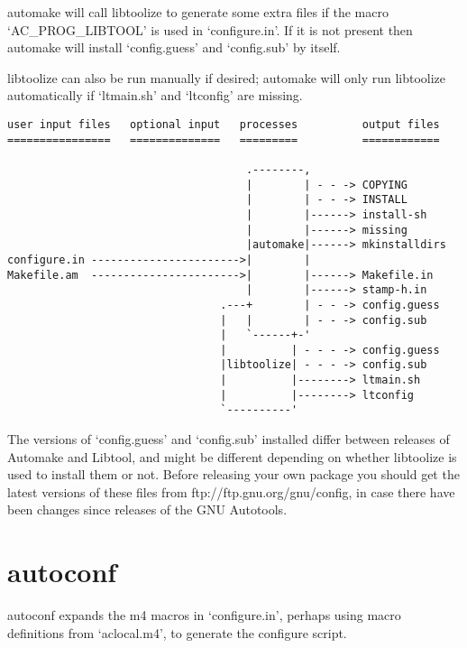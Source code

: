 automake will call libtoolize to generate some extra files if the 
macro `AC\_{}PROG\_{}LIBTOOL' is used in `configure.in'. If it is not 
present then automake will install `config.guess' and `config.sub' by itself.

libtoolize can also be run manually if desired; automake will only run libtoolize automatically if `ltmain.sh' and `ltconfig' are missing. 

\begin{verbatim}
user input files   optional input   processes          output files
================   ==============   =========          ============

                                     .--------,
                                     |        | - - -> COPYING
                                     |        | - - -> INSTALL
                                     |        |------> install-sh
                                     |        |------> missing
                                     |automake|------> mkinstalldirs
configure.in ----------------------->|        |
Makefile.am  ----------------------->|        |------> Makefile.in
                                     |        |------> stamp-h.in
                                 .---+        | - - -> config.guess
                                 |   |        | - - -> config.sub
                                 |   `------+-'
                                 |          | - - - -> config.guess
                                 |libtoolize| - - - -> config.sub
                                 |          |--------> ltmain.sh
                                 |          |--------> ltconfig
                                 `----------'
\end{verbatim}

The versions of `config.guess' and `config.sub' installed differ between releases of Automake and Libtool, and might be different depending on whether libtoolize is used to install them or not. Before releasing your own package you should get the latest versions of these files from ftp://ftp.gnu.org/gnu/config, in case there have been changes since releases of the GNU Autotools.

\section{autoconf}

autoconf expands the m4 macros in `configure.in', perhaps using macro definitions from `aclocal.m4', to generate the configure script.


